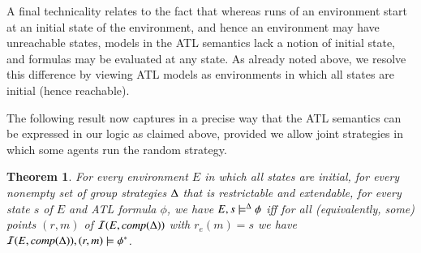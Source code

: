\documentclass[a4wide]{article}
\newtheorem{theorem}{Theorem}
\theoremstyle{examplesty}
\newcommand{\I}{\mathcal{I}}
\newcommand{\Env}{E}
\begin{document}
A final technicality relates to the fact that 
whereas runs of an environment start at an initial state of the environment, and hence an environment may have unreachable states,  
models in the ATL semantics lack a notion of initial state, and formulas may be evaluated at any state. 
As already noted above, we  resolve this difference by viewing ATL models as environments in which 
all states are initial (hence reachable). 

The following result now captures in a precise way that the ATL semantics can be expressed in our logic
as claimed above, provided we allow joint strategies in which some agents run the random strategy. 


\begin{theorem} \label{thm:atl}
For every environment $\Env$ in which all states are initial, for every
nonempty set of group strategies $\Delta$ that is restrictable
and extendable, 
for every
state $s$ of $\Env$ and ATL formula $\phi$, 
we have  $\Env, s \models^\GStrats \phi$ iff for all (equivalently, some)  points $(r,m)$ of  
$\I(\Env,\compl{\GStrats}) $ with $r_e(m) = s$ we have $\I(\Env,\compl{\GStrats}), (r,m)\models \trl{\phi}$.  
\end{theorem} 
\end{document}
